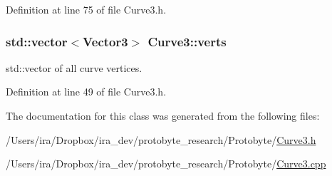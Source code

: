 Definition at line 75 of file Curve3.\-h.

\hypertarget{class_curve3_a9937ea75c1a2467d1dc61605c5b958c8}{
\subsubsection[{verts}]{\setlength{\rightskip}{0pt plus 5cm}std\-::vector$<${\bf Vector3}$>$ Curve3\-::verts\hspace{0.3cm}{\ttfamily [protected]}}}\label{class_curve3_a9937ea75c1a2467d1dc61605c5b958c8}
std\-::vector of all curve vertices. 

Definition at line 49 of file Curve3.\-h.



The documentation for this class was generated from the following files\-:\begin{DoxyCompactItemize}
\item 
/\-Users/ira/\-Dropbox/ira\-\_\-dev/protobyte\-\_\-research/\-Protobyte/\hyperlink{_curve3_8h}{Curve3.\-h}\item 
/\-Users/ira/\-Dropbox/ira\-\_\-dev/protobyte\-\_\-research/\-Protobyte/\hyperlink{_curve3_8cpp}{Curve3.\-cpp}\end{DoxyCompactItemize}
